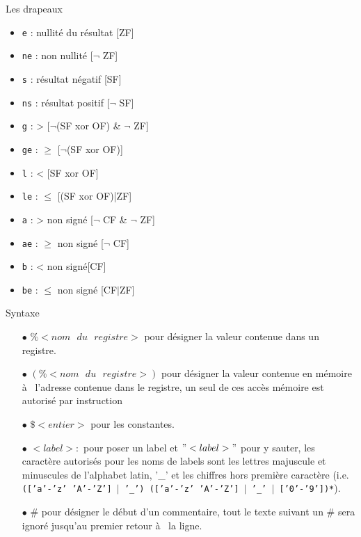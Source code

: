 \documentclass[intlimits, 10pt]{beamer}
\begin{document}
		\begin{frame}{Les drapeaux}
	\begin{itemize}
		\item \texttt{e} : nullité du résultat [ZF]
		\item \texttt{ne} : non nullité [$\neg$ ZF]
		\item \texttt{s} : résultat négatif [SF]
		\item \texttt{ns} : résultat positif [$\neg$ SF]
		\item \texttt{g} : > [$\neg$(SF xor OF) \& $\neg$ ZF] 
		\item \texttt{ge} : $\geqslant$ [$\neg$(SF xor OF)]
		\item \texttt{l} : < [SF xor OF]
		\item \texttt{le} : $\leqslant$ [(SF xor OF)|ZF]
		\item \texttt{a} : > non signé [$\neg$ CF \& $\neg$ ZF]
		\item \texttt{ae} : $\geqslant$ non signé [$\neg$ CF]
		\item \texttt{b} : < non signé[CF]
		\item \texttt{be} : $\leqslant$ non signé [CF$\vert$ZF]
	\end{itemize}
	\end{frame}
		
	\begin{frame}{Syntaxe}
		\begin{itemize}
		\item[$\bullet$] $\%<nom \text{ } du \text{ } registre>$ pour désigner la valeur contenue dans un registre.
		\item[$\bullet$] $(\%<nom \text{ } du \text{ } registre>)$ pour désigner la valeur contenue en mémoire à  l'adresse contenue dans le registre, un seul de ces accès mémoire est autorisé par instruction
		\item[$\bullet$] $\$<entier>$ pour les constantes.
		\item[$\bullet$] $<label>:$ pour poser un label et $"<label>"$ pour y sauter, les caractère autorisés pour les noms de labels sont les lettres majuscule et minuscules de l'alphabet latin, '\_' et les chiffres hors première caractère (i.e. \texttt{(['a'-'z' 'A'-'Z'] $\vert$ '\_') (['a'-'z' 'A'-'Z'] $\vert$ '\_' $\vert$ ['0'-'9'])*}).
		\item[$\bullet$] $\#$ pour désigner le début d'un commentaire, tout le texte suivant un $\#$ sera ignoré jusqu'au premier retour à  la ligne.
	\end{itemize}
	\end{frame}
	
\end{document}
